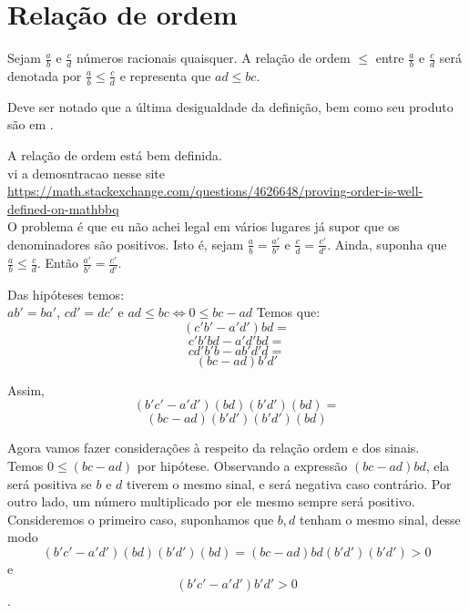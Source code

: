\documentclass[../main.tex]{subfiles}
\begin{document}
\section{Relação de ordem}
\begin{defi}
    Sejam $\frac{a}{b}$ e $\frac{c}{d}$ números racionais quaisquer. A relação de ordem $\leq$ entre $\frac{a}{b}$ e $\frac{c}{d}$ será denotada por $\frac{a}{b} \leq \frac{c}{d}$ e representa que $ad \leq bc$. 
\end{defi}
\begin{obs}
    Deve ser notado que a última desigualdade da definição, bem como seu produto são em \Z.
\end{obs}
\begin{prop}
    A relação de ordem está bem definida.  \\
    vi a demosntracao nesse site \url{https://math.stackexchange.com/questions/4626648/proving-order-is-well-defined-on-mathbbq}\\
    O problema é que eu não achei legal em vários lugares já supor que os denominadores são positivos.
    Isto é, sejam $\frac{a}{b} = \frac{a'}{b'}$ e $\frac{c}{d} = \frac{c'}{d'}$. Ainda, suponha que $\frac{a}{b} \leq \frac{c}{d}$. Então 
    $\frac{a'}{b'} = \frac{c'}{d'}$.
\end{prop}
\begin{dem}
    Das hipóteses temos: \\
    $ab' = ba'$, $cd' = dc'$ e $ad \leq bc \iff 0 \leq bc-ad$ 
    Temos que: 
    \[ (c'b'-a'd')bd = \]
    \[ c'b'bd - a'd'bd = \]
    \[ cd'b'b - ab'd'd = \]
    \[ (bc-ad) b'd' \]

    Assim, 
    \[ (b'c'-a'd')(bd)(b'd')(bd) =\]
    \[ (bc-ad)(b'd')(b'd')(bd) \]

    Agora vamos fazer considerações à respeito da relação ordem e dos sinais. \\
    Temos $0 \leq (bc-ad)$ por hipótese.
    Observando a expressão $(bc-ad)bd$, ela será positiva se $b$ e $d$ tiverem o mesmo sinal, e será negativa caso contrário. Por outro lado, um número multiplicado por ele mesmo sempre será positivo. \\
    Consideremos o primeiro caso, suponhamos que $b,d$ tenham o mesmo sinal, desse modo
    \[ (b'c'-a'd')(bd)(b'd')(bd) = (bc-ad)bd(b'd')(b'd') > 0 \]
    e 
    \[ (b'c'-a'd')b'd' > 0 \].
    
    
    
\end{dem}
\end{document}
